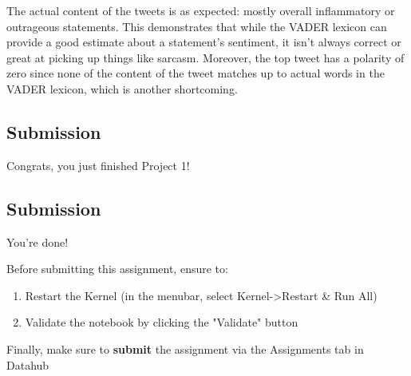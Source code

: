 \documentclass[11pt]{article}
\providecommand{\tightlist}{%
      \setlength{\itemsep}{0pt}\setlength{\parskip}{0pt}}
\begin{document}
The actual content of the tweets is as expected: mostly overall
inflammatory or outrageous statements. This demonstrates that while the
VADER lexicon can provide a good estimate about a statement's sentiment,
it isn't always correct or great at picking up things like sarcasm.
Moreover, the top tweet has a polarity of zero since none of the content
of the tweet matches up to actual words in the VADER lexicon, which is
another shortcoming.

    \subsection{Submission}\label{submission}

Congrats, you just finished Project 1!

    \subsection{Submission}\label{submission}

You're done!

Before submitting this assignment, ensure to:

\begin{enumerate}
\def\labelenumi{\arabic{enumi}.}
\tightlist
\item
  Restart the Kernel (in the menubar, select
  Kernel-\textgreater{}Restart \& Run All)
\item
  Validate the notebook by clicking the "Validate" button
\end{enumerate}

Finally, make sure to \textbf{submit} the assignment via the Assignments
tab in Datahub


    
    
    
    
\end{document}

